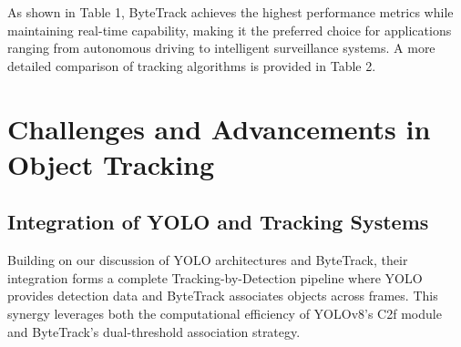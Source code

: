 \documentclass[11pt]{article}
\begin{document}
As shown in Table 1, ByteTrack achieves the highest performance metrics while maintaining real-time capability, making it the preferred choice for applications ranging from autonomous driving to intelligent surveillance systems. A more detailed comparison of tracking algorithms is provided in Table 2.





\section{Challenges and Advancements in Object Tracking}

\subsection{Integration of YOLO and Tracking Systems}
Building on our discussion of YOLO architectures and ByteTrack, their integration forms a complete Tracking-by-Detection pipeline where YOLO provides detection data and ByteTrack associates objects across frames. This synergy leverages both the computational efficiency of YOLOv8's C2f module and ByteTrack's dual-threshold association strategy.
\end{document}
